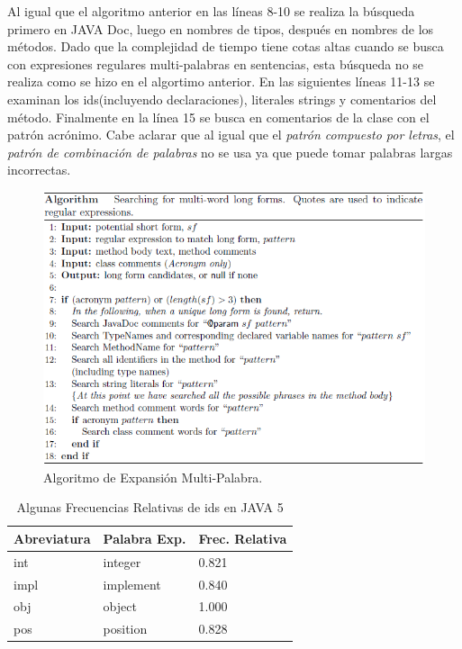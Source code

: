 \documentclass[12pt]{report}
\begin{document}
Al igual que el algoritmo anterior en las líneas 8-10 se realiza la búsqueda primero en JAVA Doc, luego en nombres de tipos, después en nombres de los métodos. Dado que la complejidad de tiempo tiene cotas altas cuando se busca con expresiones regulares multi-palabras en sentencias, esta búsqueda no se realiza como se hizo en el algortimo anterior. En las siguientes líneas 11-13 se examinan los ids(incluyendo declaraciones), literales strings y comentarios del método. Finalmente en la línea 15 se busca en comentarios de la clase con el patrón acrónimo. Cabe aclarar que al igual que el \textit{patrón compuesto por letras}, el \textit{patrón de combinación de palabras} no se usa ya que puede tomar palabras largas incorrectas.


\begin{figure}[h] %
\centering
\includegraphics[scale=0.8]{./exp_2.png}
\caption{Algoritmo de Expansión Multi-Palabra.}
\label{exp2}
\end{figure}


\pagebreak
\begin{table}
\begin{center}
   \begin{tabular}{| l |l | l |}
     \hline \textsf{Abreviatura} & \textsf{Palabra Exp.} & \textsf{Frec. Relativa} \\
     \hline \textsf{int} & \textsf{integer} & 0.821 \\
     \hline \textsf{impl} & \textsf{implement} & 0.840 \\
     \hline \textsf{obj} & \textsf{object} & 1.000 \\
     \hline \textsf{pos} & \textsf{position} & 0.828 \\
     \hline	   
   \end{tabular}
   \label{tab_mfe}
\caption{Algunas Frecuencias Relativas de ids en JAVA 5}
\end{center}   
\end {table}
\end{document}
